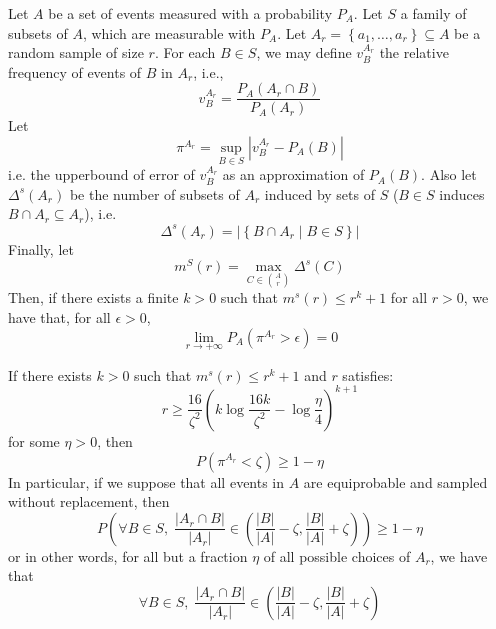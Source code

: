     \lemma[Fact 5.10]\label{fact_5.10}
        Let $A$ be a set of events measured with a probability $P_A$.
        Let $S$ a family of subsets of $A$, which are measurable with $P_A$.
        Let $A_r = \left\{ a_1, \dots, a_r \right\} \subseteq A$ be a random sample of size $r$.
        For each $B \in S$, we may define $v_B^{A_r}$ the relative frequency of events of $B$ in $A_r$, i.e.,
        $$
            v_B^{A_r} = \frac{P_A(A_r \cap B)}{P_A(A_r)}
        $$
        Let
        $$
            \pi ^{A_r} = \sup_{B \in S} \left| v_B^{A_r} - P_A(B) \right|
        $$
        i.e. the upperbound of error of $v_B^{A_r}$ as an approximation of $P_A(B)$.
        Also let $\Delta^s(A_r)$ be the number of subsets of $A_r$ induced by sets of $S$ ($B\in S$ induces
        $B \cap A_r \subseteq A_r$), i.e.
        $$
            \Delta^s(A_r) = \left| \left\{ B \cap A_r \mid B \in S \right\} \right|
        $$
        Finally, let
        $$
            m^S(r) = \max_{C \in {A \choose r}} \Delta^s(C)
        $$
        Then, if there exists a finite $k > 0$ such that $m^s(r) \leq r^k +1$ for all $r > 0$, we have that,
        for all $\epsilon > 0$,
        $$
            \lim_{r \to +\infty} P_A\left( \pi^{A_r} > \epsilon \right) = 0
        $$

    \remark[Fact 5.12]\label{fact_5.12}
        If there exists $k > 0$ such that $m^s(r) \leq r^k + 1$ and $r$ satisfies:
        $$
            r \geq \frac{16}{\zeta^2} \left( k \log \frac{16 k}{\zeta^2} - \log \frac{\eta}{4} \right)^{k+1}
        $$
        for some $\eta > 0$, then
        $$
            P\left( \pi^{A_r} < \zeta \right) \geq 1 - \eta
        $$
        In particular, if we suppose that all events in $A$ are equiprobable and sampled without replacement, then
        $$
            P\left( \forall B \in S, \; \frac{\left| A_r \cap B \right|}{\left| A_r \right|} \in
                 \left( \frac{\left| B \right|}{\left| A \right|} -
                 \zeta, \frac{\left| B \right|}{\left| A \right|} + \zeta \right) \right) \geq 1 - \eta
        $$
        or in other words, for all but a fraction $\eta$ of all possible choices of $A_r$, we have that
        $$
            \forall B \in S, \; \frac{\left| A_r \cap B \right|}{\left| A_r \right|} \in
                 \left( \frac{\left| B \right|}{\left| A \right|} -
                 \zeta, \frac{\left| B \right|}{\left| A \right|} + \zeta \right)
        $$

